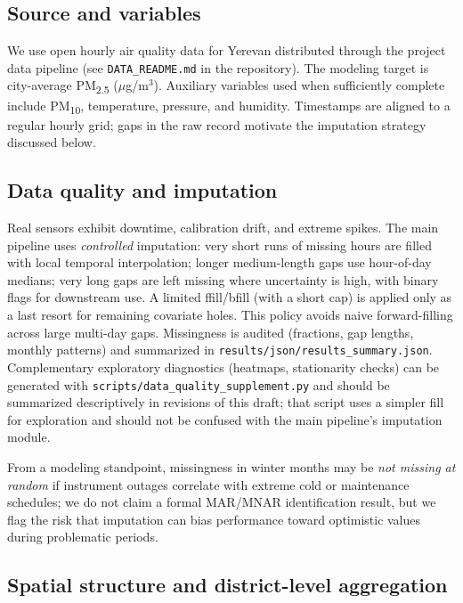 \documentclass[11pt,a4paper]{article}
\begin{document}
\subsection{Source and variables}

We use open hourly air quality data for Yerevan distributed through the project data pipeline (see \texttt{DATA\_README.md} in the repository). The modeling target is city-average PM\textsubscript{2.5} ($\mu$g/m$^3$). Auxiliary variables used when sufficiently complete include PM\textsubscript{10}, temperature, pressure, and humidity. Timestamps are aligned to a regular hourly grid; gaps in the raw record motivate the imputation strategy discussed below.

\subsection{Data quality and imputation}

Real sensors exhibit downtime, calibration drift, and extreme spikes. The main pipeline uses \emph{controlled} imputation: very short runs of missing hours are filled with local temporal interpolation; longer medium-length gaps use hour-of-day medians; very long gaps are left missing where uncertainty is high, with binary flags for downstream use. A limited ffill/bfill (with a short cap) is applied only as a last resort for remaining covariate holes. This policy avoids naive forward-filling across large multi-day gaps. Missingness is audited (fractions, gap lengths, monthly patterns) and summarized in \texttt{results/json/results\_summary.json}. Complementary exploratory diagnostics (heatmaps, stationarity checks) can be generated with \texttt{scripts/data\_quality\_supplement.py} and should be summarized descriptively in revisions of this draft; that script uses a simpler fill for exploration and should not be confused with the main pipeline’s imputation module.

From a modeling standpoint, missingness in winter months may be \emph{not missing at random} if instrument outages correlate with extreme cold or maintenance schedules; we do not claim a formal MAR/MNAR identification result, but we flag the risk that imputation can bias performance toward optimistic values during problematic periods.

\subsection{Spatial structure and district-level aggregation}
\end{document}
